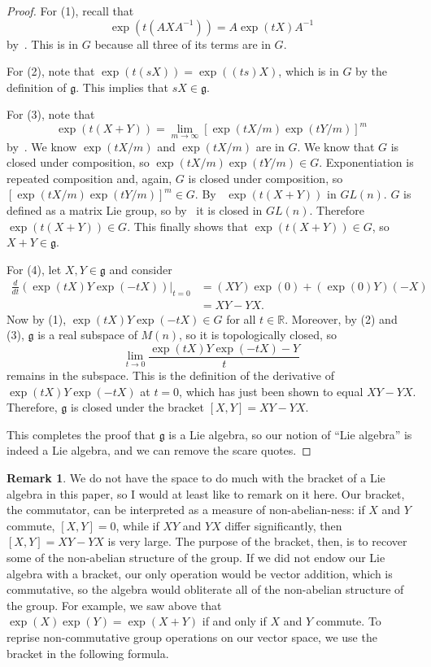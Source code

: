 \documentclass[12pt]{article}
\newcommand{\R}{\mathbb{R}}
\newcommand{\g}{\mathfrak{g}}
\theoremstyle{definition}
\theoremstyle{definition}
\theoremstyle{definition}
\theoremstyle{definition}
\newtheorem{rmk}[them]{Remark}
\theoremstyle{definition}
\theoremstyle{definition}
\theoremstyle{definition}
\theoremstyle{definition}
\begin{document}
\begin{proof}
\par{For (1), recall that 
\[
\exp(t(AXA^{-1})) = A \exp(tX) A^{-1}
\]
by~. This is in $G$ because all
three of its terms are in $G$.}

\par{For (2), note that $\exp(t(sX)) =
\exp((ts)X)$, which is in $G$ by the
definition of $\g$. This implies that $sX \in
\g$.}

\par{For (3), note that
\[
\exp(t(X+Y)) = \lim_{m \to
\infty}{[\exp(tX/m)\exp(tY/m)]}^m
\]
by~. We know $\exp(tX/m)$ and
$\exp(tX/m)$ are in $G$. We know that $G$ is
closed under composition, so $\exp(tX/m)\exp(tY/m)
\in G$. Exponentiation is repeated composition
and, again, $G$ is closed under composition, so
${[\exp(tX/m)\exp(tY/m)]}^m \in G$.
By~ $\exp(t(X+Y))$ in $GL(n)$.
$G$ is defined as a matrix Lie group, so
by~ it is closed in $GL(n)$. Therefore
$\exp(t(X+Y)) \in G$. This finally shows that
$\exp(t(X+Y)) \in G$, so $X + Y \in \g$.}

\par{For (4), let $X, Y \in \g$ and consider
\[
\begin{aligned}
    \frac{d}{dt}(\exp(tX)Y\exp(-tX))\Big|_{t=0} &
    = (XY)\exp(0) + (\exp(0)Y)(-X) \\ 
    & = XY - YX.
\end{aligned}
\] 
Now by (1), $\exp(tX) Y \exp(-tX)
\in G$ for all $t \in \R$. Moreover, by (2) and
(3), $\g$ is a real subspace of $M(n)$, so it is
topologically closed, so
\[
\lim_{t \to 0}\frac{\exp(tX)Y\exp(-tX) - Y}{t}
\]
remains in the subspace. This is the definition of
the derivative of $\exp(tX)Y\exp(-tX)$ at $t = 0$,
which has just been shown to equal $XY-YX$.
Therefore, $\g$ is closed under the bracket $[X,Y]
= XY - YX$.}

\par{This completes the proof that $\g$ is a Lie algebra, so our notion of “Lie algebra” is indeed a Lie algebra, and we can remove the scare quotes.}
\end{proof}

\begin{rmk}
We do not have the space to do much with the
bracket of a Lie algebra in this paper, so I would
at least like to remark on it here. Our bracket,
the commutator, can be interpreted as a measure
of non-abelian-ness: if $X$ and $Y$ commute,
$[X,Y] = 0$, while if $XY$ and $YX$ differ
significantly, then $[X,Y] = XY - YX$ is very
large. The purpose of the bracket, then, is to
recover some of the non-abelian structure of the
group. If we did not endow our Lie algebra with a
bracket, our only operation would be vector
addition, which is commutative, so the algebra
would obliterate all of the non-abelian structure of
the group. For example, we saw above that
$\exp(X)\exp(Y) = \exp(X + Y)$ if and only if $X$
and $Y$ commute. To reprise non-commutative group
operations on our vector space, we use the bracket
in the following formula.
\end{rmk}
\end{document}
